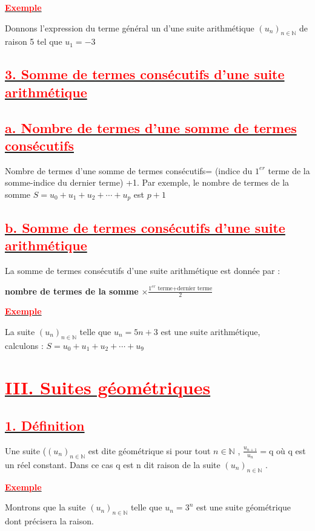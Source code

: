 \documentclass[12pt]{article}
\begin{document}
\underline{\textbf{\textcolor{red}{Exemple}}}

Donnons l’expression du terme général un d’une suite arithmétique $(u_{n})_{n\in\mathbb{N}}$  de raison 5 tel que $u_{1} = -3$
\subsection*{\underline{\textbf{\textcolor{red}{3. Somme de termes consécutifs d’une suite arithmétique}}}}
\subsection*{\underline{\textbf{\textcolor{red}{a. Nombre de termes d’une somme de termes consécutifs}}}}
Nombre de termes d’une somme de termes consécutifs= (indice du $1^{er}$ terme de la somme-indice du dernier
terme) +1. Par exemple, le nombre de termes de la somme $S = u_{0} + u_{1} + u_{2} +\cdots+u_{p}$ est $p+1$
\subsection*{\underline{\textbf{\textcolor{red}{b. Somme de termes consécutifs d’une suite arithmétique}}}}
La somme de termes consécutifs d’une suite arithmétique est donnée par :

\textbf{nombre de termes de la somme} $ \times \frac{1^{er}\text{ terme+dernier terme}}{2} $

\underline{\textbf{\textcolor{red}{Exemple}}}

La suite $(u_{n})_{n\in\mathbb{N}}$ telle que $u_{n} = 5n + 3$ est une suite arithmétique,\\
calculons : $S = u_{0} + u_{1} + u_{2} +\cdots+u_{9}$
\section*{\underline{\textbf{\textcolor{red}{III. Suites géométriques}}}}
\subsection*{\underline{\textbf{\textcolor{red}{1. Définition}}}}
Une suite ($(u_{n})_{n\in\mathbb{N}}$ est dite géométrique si pour tout $n\in\mathbb{N}$ , 
$\frac{u_{n+1}}{u_{n}}=$q où q est un réel constant. Dans ce cas q est n dit raison de la suite $(u_{n})_{n\in\mathbb{N}}$ .

\underline{\textbf{\textcolor{red}{Exemple}}}

Montrons que la suite $(u_{n})_{n\in\mathbb{N}}$ telle que $u_{n} = 3^{n}$ est une suite géométrique dont précisera la raison.
\end{document}
